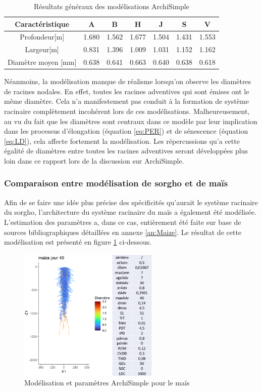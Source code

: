 \begin{table}[ht]
    \centering
    \caption{Résultats généraux des modélisations ArchiSimple}
    \begin{tabular}{c|c c c c c c}
    Caractéristique & A & B & H & J & S & V \\
    \hline 
    Profondeur[m] & 1.680 & 1.562 & 1.677 & 1.504 & 1.431 & 1.553 \\
    Largeur[m] & 0.831 & 1.396 & 1.009 & 1.031 & 1.152 & 1.162 \\
    Diamètre moyen [mm] & 0.638 & 0.641 & 0.663 & 0.640 & 0.638 & 0.618
    \end{tabular}
    \label{tab:roots}
\end{table}

Néanmoins, la modélisation manque de réalisme lorsqu'on observe les diamètres de racines nodales.
En effet, toutes les racines adventives qui sont émises ont le même diamètre.
Cela n'a manifestement pas conduit à la formation de système racinaire complètement incohérent lors de ces modélisations.
Malheureusement, au vu du fait que les diamètres sont centraux dans ce modèle par leur implication dans les processus d'élongation (équation \ref{eq:PER}) et de sénescence (équation \ref{eq:LD}), cela affecte fortement la modélisation.
Les répercussions qu'a cette égalité de diamètres entre toutes les racines adventives seront développées plus loin dans ce rapport lors de la discussion sur ArchiSimple.

\subsubsection{Comparaison entre modélisation de sorgho et de maïs} 

Afin de se faire une idée plus précise des spécificités qu'aurait le système racinaire du sorgho, l'architecture du système racinaire du maïs a également été modélisée.
L'estimation des paramètres a, dans ce cas, entièrement été faite sur base de sources bibliographiques détaillées en annexe \ref{an:Maize}.
Le résultat de cette modélisation est présenté en figure \ref{fig:roots_maize} ci-dessous.

\begin{figure}[ht]
\centering
\includegraphics[width=0.6\textwidth]{Image/roots_maize.png}
\caption{Modélisation et paramètres ArchiSimple pour le maïs}
\label{fig:roots_maize}
\end{figure}

